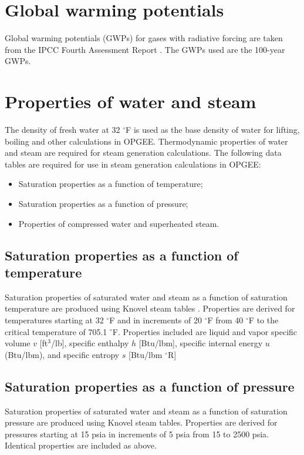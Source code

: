 \documentclass[11pt]{report}
\begin{document}
\section{Global warming potentials} \label{sec:GWPs}

Global warming potentials (GWPs) for gases with radiative forcing are taken from the IPCC Fourth Assessment Report \cite{IPCC2007}. The GWPs used are the 100-year GWPs. 





\section{Properties of water and steam}
The density of fresh water at 32 $^\circ$F is used as the base density of water for lifting, boiling and other calculations in OPGEE. 
Thermodynamic properties of water and steam are required for steam generation calculations. The following data tables are required for use in steam generation calculations in OPGEE:
\begin{itemize}
\item Saturation properties as a function of temperature;
\item Saturation properties as a function of pressure;
\item Properties of compressed water and superheated steam.
\end{itemize}

\subsection{Saturation properties as a function of temperature}
Saturation  properties of saturated water and steam as a function of saturation temperature are produced using Knovel steam tables \cite[Table 1b]{Knovel}. Properties are derived for temperatures starting at 32 $^\circ$F and in increments of 20 $^\circ$F from 40 $^\circ$F to the critical temperature of 705.1 $^\circ$F. Properties included are liquid and vapor specific volume $v$ [ft$^3$/lb], specific enthalpy $h$ [Btu/lbm], specific internal energy $u$ (Btu/lbm), and specific entropy $s$ [Btu/lbm $^\circ$R]

\subsection{Saturation properties as a function of pressure}
Saturation properties of  saturated water and steam as a function of saturation pressure are produced using Knovel steam tables\cite[Table 1b]{Knovel}. Properties are derived for pressures starting at 15 psia in increments of 5 psia from 15 to 2500 psia. Identical properties are included as above.
\end{document}
